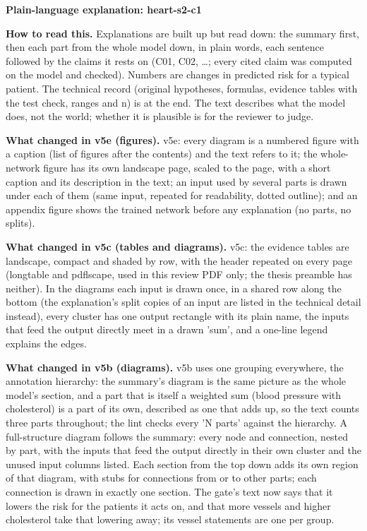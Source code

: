 \documentclass[a4paper,10pt]{article}
\begin{document}
\begin{center}{\Large\bfseries Plain-language explanation: heart-s2-c1\par}\vspace{2mm}{\small AI-assisted drafts for review. Nothing here has been verified by a person.\par}\end{center}
\noindent\textbf{How to read this.} Explanations are built up but read down: the summary first, then each part from the whole model down, in plain words, each sentence followed by the claims it rests on (C01, C02, \ldots; every cited claim was computed on the model and checked). Numbers are changes in predicted risk for a typical patient. The technical record (original hypotheses, formulas, evidence tables with the test check, ranges and n) is at the end. The text describes what the model does, not the world; whether it is plausible is for the reviewer to judge.
\par\medskip\noindent\textbf{What changed in v5e (figures).} v5e: every diagram is a numbered figure with a caption (list of figures after the contents) and the text refers to it; the whole-network figure has its own landscape page, scaled to the page, with a short caption and its description in the text; an input used by several parts is drawn under each of them (same input, repeated for readability, dotted outline); and an appendix figure shows the trained network before any explanation (no parts, no splits).
\par\medskip\noindent\textbf{What changed in v5c (tables and diagrams).} v5c: the evidence tables are landscape, compact and shaded by row, with the header repeated on every page (longtable and pdflscape, used in this review PDF only; the thesis preamble has neither). In the diagrams each input is drawn once, in a shared row along the bottom (the explanation's split copies of an input are listed in the technical detail instead), every cluster has one output rectangle with its plain name, the inputs that feed the output directly meet in a drawn 'sum', and a one-line legend explains the edges.
\par\medskip\noindent\textbf{What changed in v5b (diagrams).} v5b uses one grouping everywhere, the annotation hierarchy: the summary's diagram is the same picture as the whole model's section, and a part that is itself a weighted sum (blood pressure with cholesterol) is a part of its own, described as one that adds up, so the text counts three parts throughout; the lint checks every 'N parts' against the hierarchy. A full-structure diagram follows the summary: every node and connection, nested by part, with the inputs that feed the output directly in their own cluster and the unused input columns listed. Each section from the top down adds its own region of that diagram, with stubs for connections from or to other parts; each connection is drawn in exactly one section. The gate's text now says that it lowers the risk for the patients it acts on, and that more vessels and higher cholesterol take that lowering away; its vessel statements are one per group.
\end{document}
